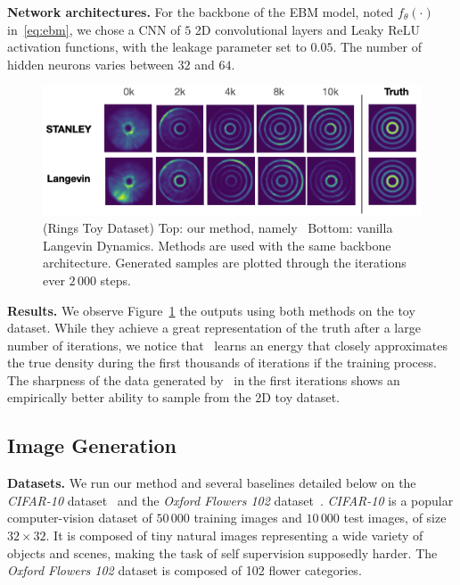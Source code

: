 \documentclass{article} %
\begin{document}
\medskip
\textbf{Network architectures.} 
For the backbone of the EBM model, noted $f_\theta(\cdot)$ in~\eqref{eq:ebm}, we chose a CNN of $5$ 2D convolutional layers and Leaky ReLU activation functions, with the leakage parameter set to $0.05$.
The number of hidden neurons varies between $32$ and $64$.


\begin{figure}[H]
\includegraphics[width=1.02\linewidth]{figs/rings}
   \caption{(Rings Toy Dataset) Top: our method, namely \algo\ Bottom: vanilla Langevin Dynamics. 
   Methods are used with the same backbone architecture. Generated samples are plotted through the iterations ever $2\,000$ steps.}
\label{fig:resultstoy}
\end{figure}


\textbf{Results.} 
We observe Figure~\ref{fig:resultstoy} the outputs using both methods on the toy dataset.
While they achieve a great representation of the truth after a large number of iterations, we notice that \algo\ learns an energy that closely approximates the true density during the first thousands of iterations if the training process.
The sharpness of the data generated by \algo\ in the first iterations shows an empirically better ability to sample from the 2D toy dataset.

\subsection{Image Generation}

\quad\textbf{Datasets.}
We run our method and several baselines detailed below on the \textit{CIFAR-10} dataset~\cite{krizhevsky2009learning} and the \emph{Oxford Flowers 102} dataset~\cite{nilsback2008automated}.
\textit{CIFAR-10}  is a popular computer-vision dataset of $50\,000$ training images and $10\,000$ test images, of size $32\times 32$. 
It is composed of tiny natural images representing a wide variety of objects and scenes, making the task of self supervision supposedly harder.
The \emph{Oxford Flowers 102} dataset is composed of 102 flower categories.
\end{document}
